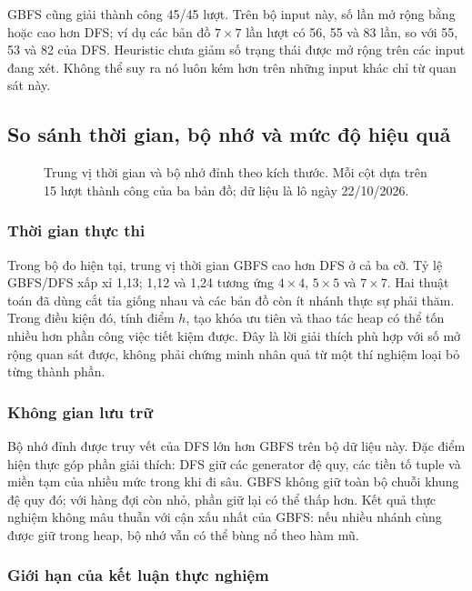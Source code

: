 GBFS cũng giải thành công 45/45 lượt. Trên bộ input này, số lần mở rộng bằng
hoặc cao hơn DFS; ví dụ các bản đồ $7\times7$ lần lượt có 56, 55 và 83 lần,
so với 55, 53 và 82 của DFS. Heuristic chưa giảm số trạng thái được mở rộng
trên các input đang xét. Không thể suy ra nó luôn kém hơn trên những input
khác chỉ từ quan sát này.

\subsection{So sánh thời gian, bộ nhớ và mức độ hiệu quả}


\begin{figure}[H]\centering

\caption{Trung vị thời gian và bộ nhớ đỉnh theo kích thước. Mỗi cột dựa trên
15 lượt thành công của ba bản đồ; dữ liệu là lô ngày 22/10/2026.}
\label{fig:charts}
\end{figure}

\subsubsection{Thời gian thực thi}

Trong bộ đo hiện tại, trung vị thời gian GBFS cao hơn DFS ở cả ba cỡ. Tỷ lệ
GBFS/DFS xấp xỉ 1,13; 1,12 và 1,24 tương ứng $4\times4$, $5\times5$ và
$7\times7$. Hai thuật toán đã dùng cắt tỉa giống nhau và các bản đồ còn ít
nhánh thực sự phải thăm. Trong điều kiện đó, tính điểm $h$, tạo khóa ưu tiên
và thao tác heap có thể tốn nhiều hơn phần công việc tiết kiệm được. Đây là
lời giải thích phù hợp với số mở rộng quan sát được, không phải chứng minh
nhân quả từ một thí nghiệm loại bỏ từng thành phần.

\subsubsection{Không gian lưu trữ}

Bộ nhớ đỉnh được truy vết của DFS lớn hơn GBFS trên bộ dữ liệu này. Đặc điểm
hiện thực góp phần giải thích: DFS giữ các generator đệ quy, các tiền tố tuple
và miền tạm của nhiều mức trong khi đi sâu. GBFS không giữ toàn bộ chuỗi khung
đệ quy đó; với hàng đợi còn nhỏ, phần giữ lại có thể thấp hơn. Kết quả thực
nghiệm không mâu thuẫn với cận xấu nhất của GBFS: nếu nhiều nhánh cùng được
giữ trong heap, bộ nhớ vẫn có thể bùng nổ theo hàm mũ.

\subsubsection{Giới hạn của kết luận thực nghiệm}

